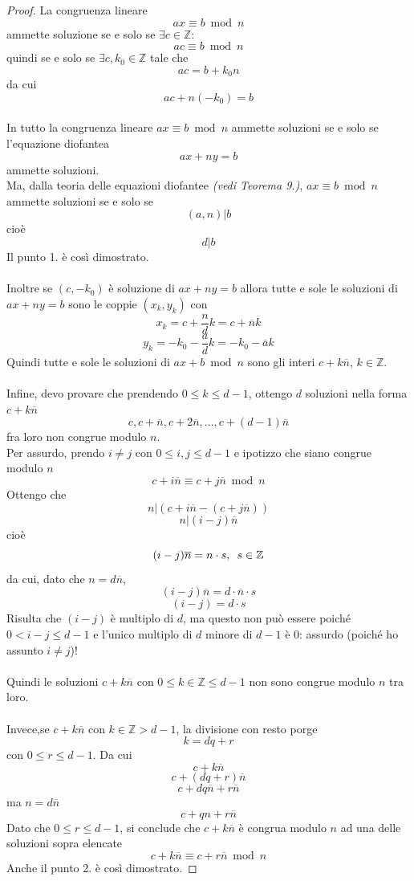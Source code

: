 \documentclass[a4paper,12pt, oneside]{book}
\begin{document}
\begin{teorema}
			\begin{proof}
				La congruenza lineare
				$$ax \equiv b \bmod n$$
				ammette soluzione se e solo se $\exists c \in \mathbb{Z}$:
				$$ac \equiv b \bmod n$$
				quindi se e solo se $\exists c, k_0 \in \mathbb{Z}$ tale che
				$$ac = b +k_0 n$$
				da cui
				$$ac + n(-k_0) = b$$\\
				In tutto  la congruenza lineare $ax \equiv b \bmod n$ ammette soluzioni se e solo se l'equazione diofantea
				$$ax+ny=b$$
				ammette soluzioni.\\
				Ma, dalla teoria delle equazioni diofantee \textit{(vedi Teorema 9.)}, $ax \equiv b \bmod n$ ammette soluzioni se e solo se
				$$(a,n)|b$$ cioè $$d|b$$
				Il punto 1. è così dimostrato.\\\\
				Inoltre se $(c, -k_0)$ è soluzione di $ax+ny=b$ allora tutte e sole le soluzioni di $ax+ny=b$ sono le coppie $(x_k,y_k)$ con
				$$x_k=c+\frac{n}{d}k = c+\overline{n}k$$
				$$y_k=-k_0-\frac{a}{d}k = -k_0-\overline{a}k$$
				Quindi tutte e sole le soluzioni di $ax+b \bmod n$ sono gli interi $c+k\overline{n}$, $k \in \mathbb{Z}$.\\\\
				Infine, devo provare che prendendo $0 \leq k \leq d-1$, ottengo $d$ soluzioni nella forma $c+k\overline{n}$
				$$c, c+\overline{n}, c+2\overline{n}, \dots, c+(d-1)\overline{n}$$
				fra loro non congrue modulo $n$.\\
				Per assurdo, prendo $i \not = j$ con $0 \leq i,j \leq d-1$
				e ipotizzo che siano congrue modulo $n$
				$$c+i\overline{n} \equiv c+j\overline{n} \bmod n$$
				Ottengo che
				$$n | (c+i\overline{n} - (c+ j\overline{n}))$$
				$$n | (i-j)\overline{n}$$
				cioè
				$$(i-j)\overline{n} = n \cdot s \mbox{,\space\space }s \in \mathbb{Z}$$
				da cui, dato che $n = d\overline{n}$,
				$$(i-j)\overline{n} = d \cdot \overline{n} \cdot s$$
				$$(i-j) = d \cdot s$$
				Risulta che $(i-j)$ è multiplo di $d$, ma questo non può essere poiché $0 < i-j \leq d-1$ e l'unico multiplo di $d$ minore di $d-1$ è $0$: assurdo (poiché ho assunto $i \not = j$)!\\\\
				Quindi le soluzioni $c+k\overline{n}$ con $0 \leq k \in \mathbb{Z} \leq d-1$ non sono congrue modulo $n$ tra loro.\\\\
				Invece,se $c+k\overline{n}$ con $k \in \mathbb{Z} > d-1$, la divisione con resto porge
				$$k=dq+r$$ con $0 \leq r \leq d-1$. Da cui
				$$c+k\overline{n}$$
				$$c+(dq+r)\overline{n}$$
				$$c+dq\overline{n}+r\overline{n}$$
				ma $n = d\overline{n}$
				$$c+qn+r\overline{n}$$
				Dato che $0 \leq r \leq d-1$, si conclude che $c+k\overline{n}$ è congrua modulo $n$ ad una delle soluzioni sopra elencate $$c+k\overline{n} \equiv c+r\overline{n} \bmod n$$
				Anche il punto 2. è così dimostrato.
				
			\end{proof}	
		\end{teorema}
\end{document}
